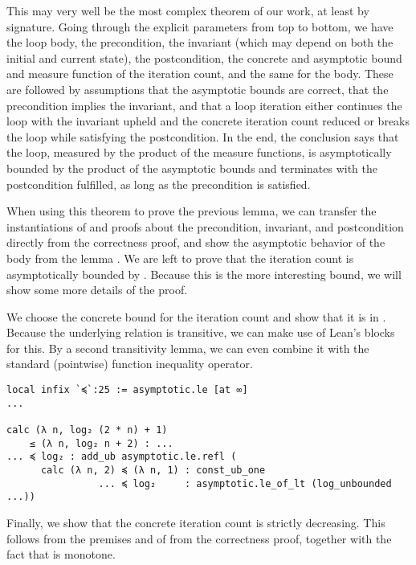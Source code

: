 This may very well be the most complex theorem of our work, at least by
signature. Going through the explicit parameters from top to bottom, we have the
loop body, the precondition, the invariant (which may depend on both the initial
and current state), the postcondition, the concrete and asymptotic bound and
measure function of the iteration count, and the same for the body. These are
followed by assumptions that the asymptotic bounds are correct, that the
precondition implies the invariant, and that a loop iteration either continues
the loop with the invariant upheld and the concrete iteration count reduced or
breaks the loop while satisfying the postcondition. In the end, the conclusion says
that the loop, measured by the product of the measure functions, is
asymptotically bounded by the product of the asymptotic bounds and terminates
with the postcondition fulfilled, as long as the precondition is satisfied.

When using this theorem to prove the previous lemma, we can transfer the
instantiations of and proofs about the precondition, invariant, and
postcondition directly from the correctness proof, and show the asymptotic
behavior of the body from the lemma . We are left to prove
that the iteration count is asymptotically bounded by . Because this
is the more interesting bound, we will show some more details of the proof.

We choose the concrete bound  for the iteration
count and show that it is in . Because the underlying relation
 is transitive, we can make use of Lean's  blocks
for this. By a second transitivity lemma, we can even combine it with the
standard (pointwise) function inequality operator.

\begin{verbatim}
local infix `≼`:25 := asymptotic.le [at ∞]
...

calc (λ n, log₂ (2 * n) + 1)
    ≤ (λ n, log₂ n + 2) : ...
... ≼ log₂ : add_ub asymptotic.le.refl (
      calc (λ n, 2) ≼ (λ n, 1) : const_ub_one
                ... ≼ log₂     : asymptotic.le_of_lt (log_unbounded ...))
\end{verbatim}

Finally, we show that the concrete iteration count is strictly decreasing. This
follows from the premises  and  of  from the correctness proof, together with the fact
that  is monotone.

